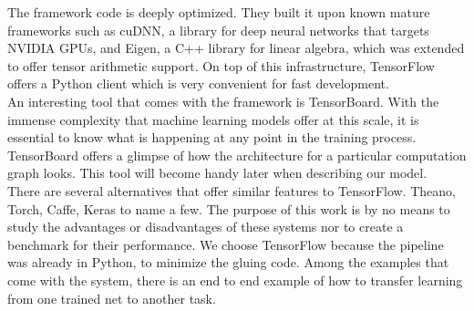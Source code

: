 The framework code is deeply optimized. They built it upon known mature frameworks such as cuDNN, a library for deep neural networks that targets NVIDIA GPUs, and Eigen, a C++ library for linear algebra, which was extended to offer tensor arithmetic support. On top of this infrastructure, TensorFlow offers a Python client which is very convenient for fast development.\\

An interesting tool that comes with the framework is TensorBoard. With the immense complexity that machine learning models offer at this scale, it is essential to know what is happening at any point in the training process. TensorBoard offers a glimpse of how the architecture for a particular computation graph looks. This tool will become handy later when describing our model.\\

There are several alternatives that offer similar features to TensorFlow. Theano, Torch, Caffe, Keras to name a few. The purpose of this work is by no means to study the advantages or disadvantages of these systems nor to create a benchmark for their performance. We choose TensorFlow because the pipeline was already in Python,  to minimize the gluing code. Among the examples that come with the system, there is an end to end example of how to transfer learning from one trained net to another task.\\












